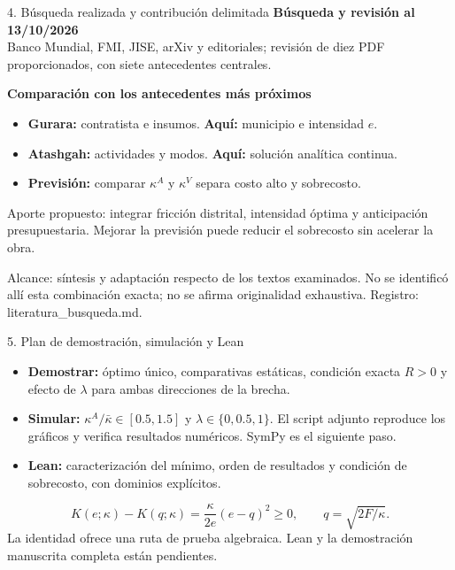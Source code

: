 \documentclass[11pt,aspectratio=169]{beamer}
\newcommand{\notefoot}[1]{\vfill{\scriptsize\color{navy!75}#1}}
\newcommand{\lead}[1]{\begin{block}{}#1\end{block}}
\begin{document}
\begin{frame}{4. Búsqueda realizada y contribución delimitada}
\textbf{Búsqueda y revisión al 13/10/2026}\\[1mm]
Banco Mundial, FMI, JISE, arXiv y editoriales; revisión de diez PDF proporcionados, con siete antecedentes centrales.
\par\vspace{3mm}
\textbf{Comparación con los antecedentes más próximos}
\begin{itemize}\setlength{\itemsep}{2mm}
\item \textbf{Gurara:} contratista e insumos. \textbf{Aquí:} municipio e intensidad $e$.
\item \textbf{Atashgah:} actividades y modos. \textbf{Aquí:} solución analítica continua.
\item \textbf{Previsión:} comparar $\kappa^A$ y $\kappa^V$ separa costo alto y sobrecosto.
\end{itemize}
\lead{Aporte propuesto: integrar fricción distrital, intensidad óptima y anticipación presupuestaria. Mejorar la previsión puede reducir el sobrecosto sin acelerar la obra.}
\notefoot{Alcance: síntesis y adaptación respecto de los textos examinados. No se identificó allí esta combinación exacta; no se afirma originalidad exhaustiva. Registro: literatura\_busqueda.md.}
\end{frame}

\begin{frame}{5. Plan de demostración, simulación y Lean}
\begin{itemize}\setlength{\itemsep}{4mm}
\item \textbf{Demostrar:} óptimo único, comparativas estáticas, condición exacta $R>0$ y efecto de $\lambda$ para ambas direcciones de la brecha.
\item \textbf{Simular:} $\kappa^A/\bar\kappa\in[0.5,1.5]$ y $\lambda\in\{0,0.5,1\}$. El script adjunto reproduce los gráficos y verifica resultados numéricos. SymPy es el siguiente paso.
\item \textbf{Lean:} caracterización del mínimo, orden de resultados y condición de sobrecosto, con dominios explícitos.
\end{itemize}
\[
K(e;\kappa)-K(q;\kappa)=\frac{\kappa}{2e}(e-q)^2\geq0,
\qquad q=\sqrt{2F/\kappa}.
\]
\notefoot{La identidad ofrece una ruta de prueba algebraica. Lean y la demostración manuscrita completa están pendientes.}
\end{frame}
\end{document}
